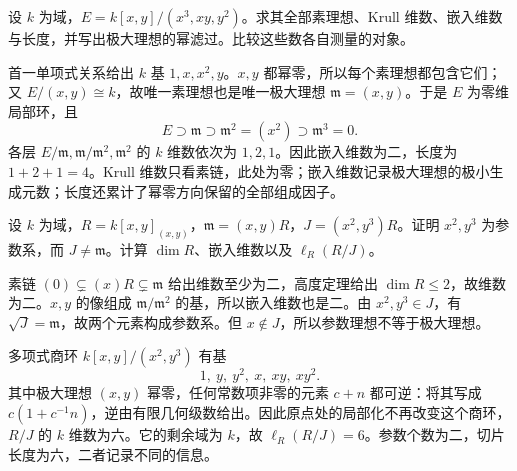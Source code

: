 \begin{exercise}\label{g5:ex:artinian-four-dimensional}
	设 \(k\) 为域，\(E=k[x,y]/(x^3,xy,y^2)\)。求其全部素理想、Krull 维数、嵌入维数与长度，并写出极大理想的幂滤过。比较这些数各自测量的对象。
\end{exercise}
\begin{solution}
	首一单项式关系给出 \(k\) 基 \(1,x,x^2,y\)。\(x,y\) 都幂零，所以每个素理想都包含它们；又 \(E/(x,y)\cong k\)，故唯一素理想也是唯一极大理想
	\(\mathfrak m=(x,y)\)。于是 \(E\) 为零维局部环，且
	\[
		E\supset\mathfrak m\supset\mathfrak m^2=(x^2)
		\supset\mathfrak m^3=0.
	\]
	各层 \(E/\mathfrak m,\mathfrak m/\mathfrak m^2,\mathfrak m^2\) 的 \(k\) 维数依次为 \(1,2,1\)。因此嵌入维数为二，长度为 \(1+2+1=4\)。Krull 维数只看素链，此处为零；嵌入维数记录极大理想的极小生成元数；长度还累计了幂零方向保留的全部组成因子。
\end{solution}

\begin{exercise}\label{g5:ex:parameter-ideal-length-six}
	设 \(k\) 为域，\(R=k[x,y]_{(x,y)}\)，\(\mathfrak m=(x,y)R\)，\(J=(x^2,y^3)R\)。证明 \(x^2,y^3\) 为参数系，而 \(J\ne\mathfrak m\)。计算 \(\dim R\)、嵌入维数以及 \(\ell_R(R/J)\)。
\end{exercise}
\begin{solution}
	素链 \((0)\subsetneq(x)R\subsetneq\mathfrak m\) 给出维数至少为二，高度定理给出 \(\dim R\leq2\)，故维数为二。\(x,y\) 的像组成 \(\mathfrak m/\mathfrak m^2\) 的基，所以嵌入维数也是二。由 \(x^2,y^3\in J\)，有 \(\sqrt J=\mathfrak m\)，故两个元素构成参数系。但 \(x\notin J\)，所以参数理想不等于极大理想。

	多项式商环 \(k[x,y]/(x^2,y^3)\) 有基
	\[
		1,\ y,\ y^2,\ x,\ xy,\ xy^2.
	\]
	其中极大理想 \((x,y)\) 幂零，任何常数项非零的元素 \(c+n\) 都可逆：将其写成 \(c(1+c^{-1}n)\)，逆由有限几何级数给出。因此原点处的局部化不再改变这个商环，\(R/J\) 的 \(k\) 维数为六。它的剩余域为 \(k\)，故 \(\ell_R(R/J)=6\)。参数个数为二，切片长度为六，二者记录不同的信息。
\end{solution}

